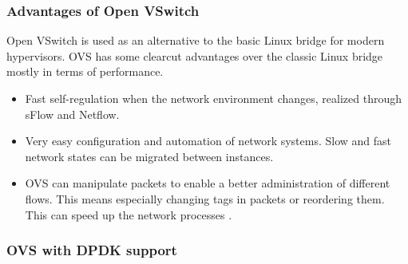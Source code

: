 \documentclass[11pt,a4paper,twoside,openright,bachelor,english]{netthesis}
\begin{document}
\subsubsection{Advantages of Open VSwitch}

Open VSwitch is used as an alternative to the basic Linux bridge for modern hypervisors. OVS has some clearcut advantages over the classic Linux bridge mostly in terms of performance. 
\begin{itemize}

\item Fast self-regulation when the network environment changes, realized through sFlow and Netflow. 

\item Very easy configuration and automation of network systems. Slow and fast network states can be migrated between instances. 

\item OVS can manipulate packets to enable a better administration of different flows. This means especially changing tags in packets or reordering them. This can speed up the network processes \cite{pothuraju2016measuring} .

\end{itemize}


\subsubsection{OVS with DPDK support}
\end{document}
